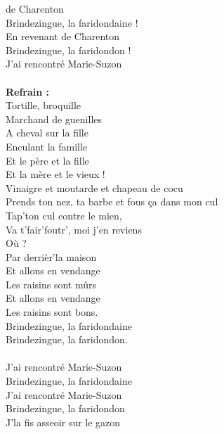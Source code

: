 
 de Charenton
\\Brindezingue, la faridondaine !
\\En revenant de Charenton
\\Brindezingue, la faridondon !
\\J'ai rencontré Marie-Suzon
\\\\\textbf{Refrain :}
\\Tortille, broquille
\\Marchand de guenilles
\\A cheval sur la fille
\\Enculant la famille
\\Et le père et la fille
\\Et la mère et le vieux !
\\Vinaigre et moutarde et chapeau de cocu
\\Prends ton nez, ta barbe et fous ça dans mon cul
\\Tap'ton cul contre le mien,
\\Va t'fair'foutr', moi j'en reviens
\\Où ?
\\Par derrièr'la maison
\\Et allons en vendange
\\Les raisins sont mûrs
\\Et allons en vendange
\\Les raisins sont bons.
\\Brindezingue, la faridondaine
\\Brindezingue, la faridondon.
\\\\J'ai rencontré Marie-Suzon
\\Brindezingue, la faridondaine
\\J'ai rencontré Marie-Suzon
\\Brindezingue, la faridondon
\\J'la fis asseoir sur le gazon
